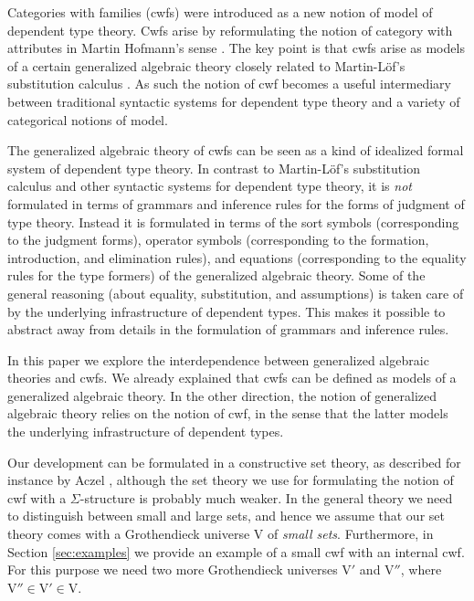 \documentclass{mscs}
\def\V{\mathrm{V}}
\begin{document}
Categories with families (cwfs) \cite{dybjer:torino} were introduced as a new notion of model of dependent type theory. Cwfs arise by reformulating the notion of category with attributes in Martin Hofmann's sense \cite{hofmann:csl}. The key point is that cwfs arise as models of a certain generalized algebraic theory closely related to Martin-Löf's substitution calculus \cite{martinlof:gbg92}. As such the notion of cwf becomes a useful intermediary between traditional syntactic systems for dependent type theory and a variety of categorical notions of model.

The generalized algebraic theory of cwfs can be seen as a kind of idealized formal system of dependent type theory. In contrast to Martin-Löf's substitution calculus and other syntactic systems for dependent type theory, it is {\em not} formulated in terms of grammars and inference rules for the forms of judgment of type theory. Instead it is formulated in terms of the sort symbols (corresponding to the judgment forms), operator symbols (corresponding to the formation, introduction, and elimination rules), and equations (corresponding to the equality rules for the type formers) of the generalized algebraic theory. Some of the general reasoning (about equality, substitution, and assumptions) is taken care of by the underlying infrastructure of dependent types. This makes it possible to abstract away from details in the formulation of grammars and inference rules.

In this paper we explore the interdependence between generalized algebraic theories and cwfs. We already explained that cwfs can be defined as models of a generalized algebraic theory.
In the other direction, the notion of generalized algebraic theory relies on the notion of cwf, in the sense that the latter models the underlying infrastructure of dependent types.

Our development can be formulated in a constructive set theory,
as described for instance by Aczel \cite{MR519801,aczel:relate}, although the set theory
we use for formulating the notion of cwf with a $\Sigma$-structure is probably
much weaker. In the general theory we need to distinguish between small and large sets, and hence we assume that our set theory comes with a Grothendieck universe $\V$ of {\em small sets}. Furthermore, in Section \ref{sec:examples} we provide an example of a small cwf with an internal cwf. For this purpose we need two more Grothendieck universes $\V'$ and $\V''$, where $\V''  \in \V' \in \V$.
\end{document}
